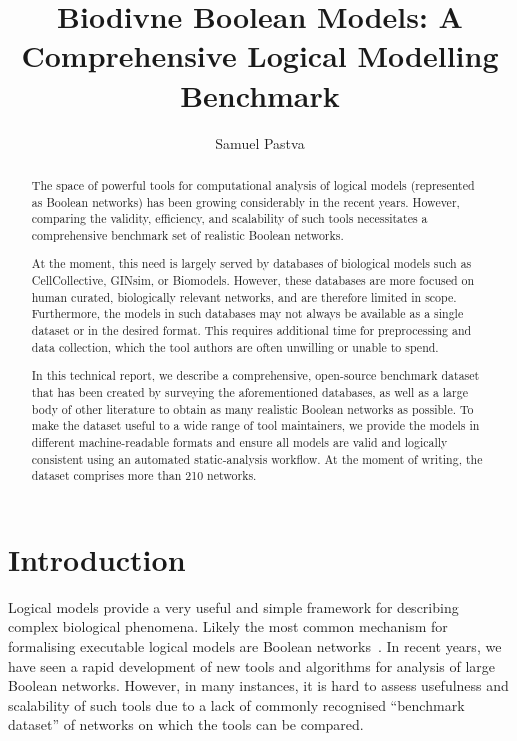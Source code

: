 \documentclass{article}
\title{Biodivne Boolean Models: A Comprehensive Logical Modelling Benchmark}
\author{Samuel Pastva}
\date{}
\begin{document}
\maketitle

\begin{abstract}
	The space of powerful tools for computational analysis of logical models (represented as Boolean networks) has been growing considerably in the recent years. However, comparing the validity, efficiency, and scalability of such tools necessitates a comprehensive benchmark set of realistic Boolean networks.
	
	At the moment, this need is largely served by databases of biological models such as CellCollective, GINsim, or Biomodels. However, these databases are more focused on human curated, biologically relevant networks, and are therefore limited in scope. Furthermore, the models in such databases may not always be available as a single dataset or in the desired format. This requires additional time for preprocessing and data collection, which the tool authors are often unwilling or unable to spend.
	
	In this technical report, we describe a comprehensive, open-source benchmark dataset that has been created by surveying the aforementioned databases, as well as a large body of other literature to obtain as many realistic Boolean networks as possible. To make the dataset useful to a wide range of tool maintainers, we provide the models in different machine-readable formats and ensure all models are valid and logically consistent using an automated static-analysis workflow. At the moment of writing, the dataset comprises more than 210 networks.
\end{abstract}

\section{Introduction}

Logical models provide a very useful and simple framework for describing complex biological phenomena. Likely the most common mechanism for formalising executable logical models are Boolean networks~\cite{bn-intro}. In recent years, we have seen a rapid development of new tools and algorithms for analysis of large Boolean networks. However, in many instances, it is hard to assess usefulness and scalability of such tools due to a lack of commonly recognised ``benchmark dataset'' of networks on which the tools can be compared.
\end{document}
